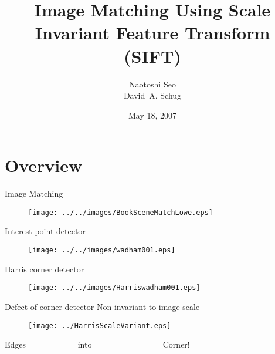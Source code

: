 \documentclass[
  size=12pt,
  paper=screen,
  mode=present,
  style=sailor
]{powerdot}
\title{Image Matching Using Scale Invariant Feature Transform (SIFT)\\}
\author{Naotoshi Seo\\David~A. Schug\\}
\date{May 18, 2007}
\begin{document}
  \maketitle %


\section[tocsection=true,slide=false]{Overview}

\begin{slide}{Image Matching}
  \begin{figure}
    \begin{center}
      \texttt{[image: ../../images/BookSceneMatchLowe.eps]}
    \end{center}
  \end{figure}
\end{slide}

\begin{slide}{Interest point detector}
  \begin{figure}
    \begin{center}
      \texttt{[image: ../../images/wadham001.eps]}
    \end{center}
  \end{figure}
\end{slide}

\begin{slide}{Harris corner detector}
  \begin{figure}
    \begin{center}
      \texttt{[image: ../../images/Harriswadham001.eps]}
    \end{center}
  \end{figure}
\end{slide}

\begin{slide}{Defect of corner detector}
  Non-invariant to image scale
  \begin{figure}
    \begin{center}
      \texttt{[image: ../HarrisScaleVariant.eps]}
    \end{center}
  \end{figure}
  \begin{center}
  Edges~~~~~~~~~~~~ into ~~~~~~~~~~~~~~~~ Corner!
  \end{center}
\end{slide}
\end{document}
